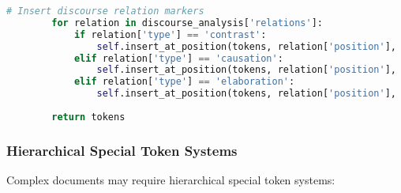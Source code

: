 \begin{lstlisting}[language=Python, caption=Dynamic special token insertion]
        # Insert discourse relation markers
        for relation in discourse_analysis['relations']:
            if relation['type'] == 'contrast':
                self.insert_at_position(tokens, relation['position'], '[CONTRAST]')
            elif relation['type'] == 'causation':
                self.insert_at_position(tokens, relation['position'], '[CAUSE]')
            elif relation['type'] == 'elaboration':
                self.insert_at_position(tokens, relation['position'], '[ELAB]')
                
        return tokens
\end{lstlisting}

\subsubsection{Hierarchical Special Token Systems}

Complex documents may require hierarchical special token systems:


